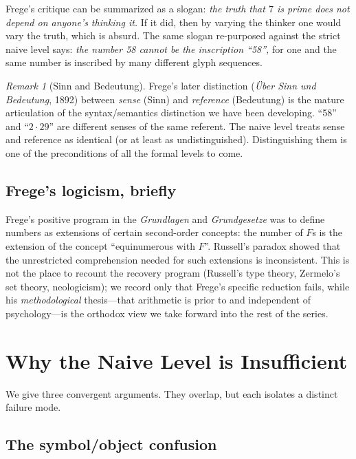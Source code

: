 \documentclass[12pt]{article}
\theoremstyle{definition}
\theoremstyle{remark}
\newtheorem{remark}[theorem]{Remark}
\begin{document}
Frege's critique can be summarized as a slogan: \emph{the truth that $7$
is prime does not depend on anyone's thinking it.} If it did, then by
varying the thinker one would vary the truth, which is absurd. The same
slogan re-purposed against the strict naive level says: \emph{the number
58 cannot be the inscription ``58'',} for one and the same number is
inscribed by many different glyph sequences.

\begin{remark}[Sinn and Bedeutung]
\label{rem:sinn-bedeutung}
Frege's later distinction (\emph{\"Uber Sinn und Bedeutung}, 1892)
between \emph{sense} (Sinn) and \emph{reference} (Bedeutung) is the
mature articulation of the syntax/semantics distinction we have been
developing. ``58'' and ``$2 \cdot 29$'' are different senses of the same
referent. The naive level treats sense and reference as identical (or at
least as undistinguished). Distinguishing them is one of the
preconditions of all the formal levels to come.
\end{remark}

\subsection{Frege's logicism, briefly}

Frege's positive program in the \emph{Grundlagen} and \emph{Grundgesetze}
was to define numbers as extensions of certain second-order concepts:
the number of $F$s is the extension of the concept ``equinumerous with
$F$''. Russell's paradox showed that the unrestricted comprehension
needed for such extensions is inconsistent. This is not the place to
recount the recovery program (Russell's type theory, Zermelo's set
theory, neologicism); we record only that Frege's specific reduction
fails, while his \emph{methodological} thesis---that arithmetic is
prior to and independent of psychology---is the orthodox view we take
forward into the rest of the series.

\section{Why the Naive Level is Insufficient}
\label{sec:insufficient}

We give three convergent arguments. They overlap, but each isolates a
distinct failure mode.

\subsection{The symbol/object confusion}
\end{document}
